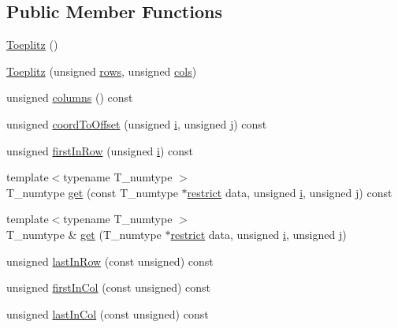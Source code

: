 \subsection*{Public Member Functions}
\begin{DoxyCompactItemize}
\item 
\hyperlink{classToeplitz_adcd641820af0f7eda830ad0c3ef29783}{Toeplitz} ()
\item 
\hyperlink{classToeplitz_aae835df39101e2975774a47b2305f0cb}{Toeplitz} (unsigned \hyperlink{classToeplitz_a78fc701939ace48cdfa2bd5cb38ffb6b}{rows}, unsigned \hyperlink{classAsymmetricMatrix_a5ef0ec381e4d33a1f19be7c3e26410d4}{cols})
\item 
unsigned \hyperlink{classToeplitz_ad76fb460e5e677bbca481757b5909ebb}{columns} () const 
\item 
unsigned \hyperlink{classToeplitz_afaeb1e3af5241111d77767dc4f731c31}{coord\+To\+Offset} (unsigned \hyperlink{indexexpr_8h_aabd77643995707c185e95c8cb2782c81}{i}, unsigned \hyperlink{indexexpr_8h_aa1f3325d66516548e69238097857fa98}{j}) const 
\item 
unsigned \hyperlink{classToeplitz_a554331d69afc95b27afef4413c755cc3}{first\+In\+Row} (unsigned \hyperlink{indexexpr_8h_aabd77643995707c185e95c8cb2782c81}{i}) const 
\item 
{\footnotesize template$<$typename T\+\_\+numtype $>$ }\\T\+\_\+numtype \hyperlink{classToeplitz_ab6fb41107db49011286a2bfb3f84c249}{get} (const T\+\_\+numtype $\ast$\hyperlink{compiler_8h_a080abdcb9c02438f1cd2bb707af25af8}{restrict} data, unsigned \hyperlink{indexexpr_8h_aabd77643995707c185e95c8cb2782c81}{i}, unsigned \hyperlink{indexexpr_8h_aa1f3325d66516548e69238097857fa98}{j}) const 
\item 
{\footnotesize template$<$typename T\+\_\+numtype $>$ }\\T\+\_\+numtype \& \hyperlink{classToeplitz_a104aae967e46426e6d3223cd7fe9fa0a}{get} (T\+\_\+numtype $\ast$\hyperlink{compiler_8h_a080abdcb9c02438f1cd2bb707af25af8}{restrict} data, unsigned \hyperlink{indexexpr_8h_aabd77643995707c185e95c8cb2782c81}{i}, unsigned \hyperlink{indexexpr_8h_aa1f3325d66516548e69238097857fa98}{j})
\item 
unsigned \hyperlink{classToeplitz_ac9b6c539f5e5a5aade13a3ec6ac5aae4}{last\+In\+Row} (const unsigned) const 
\item 
unsigned \hyperlink{classToeplitz_a7d2133049c2c3c8172b1973f110cdfaa}{first\+In\+Col} (const unsigned) const 
\item 
unsigned \hyperlink{classToeplitz_aa22125c68c707689a76a880a08e7a06e}{last\+In\+Col} (const unsigned) const 

\end{DoxyCompactItemize}
